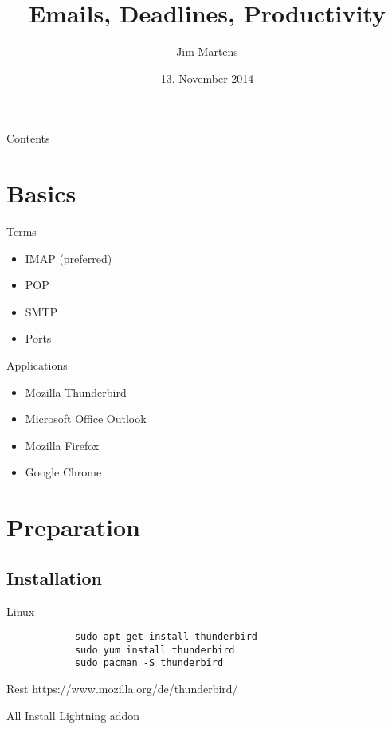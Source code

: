 \documentclass{beamer}
\begin{document}
\author{Jim Martens}
\title{Emails, Deadlines, Productivity}
\date{13. November 2014}

	\begin{frame}
		\titlepage
	\end{frame}
	
	\begin{frame}{Contents}
		\tableofcontents
	\end{frame}
	
	\section{Basics}
	\begin{frame}{Terms}
		\begin{itemize}
			\item IMAP (preferred)
			\item POP
			\item SMTP
			\item Ports
		\end{itemize}
	\end{frame}
	
	\begin{frame}{Applications}
		\begin{itemize}
			\item Mozilla Thunderbird
			\item Microsoft Office Outlook
			\item Mozilla Firefox
			\item Google Chrome
		\end{itemize}
	\end{frame}
	
	\section{Preparation}
	\subsection{Installation}
	\begin{frame}[fragile]{Linux}
		\begin{verbatim}
			sudo apt-get install thunderbird
			sudo yum install thunderbird
			sudo pacman -S thunderbird			
		\end{verbatim}
	\end{frame}
	\begin{frame}{Rest}
		https://www.mozilla.org/de/thunderbird/
	\end{frame}
	\begin{frame}{All}
		Install Lightning addon
	\end{frame}
	
\end{document}
